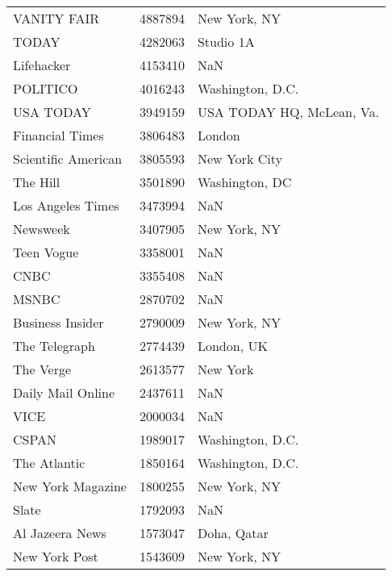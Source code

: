 \begin{longtable}{lrl}
	VANITY FAIR &    4887894 &                          New York, NY \\
	TODAY &    4282063 &                             Studio 1A \\
	Lifehacker &    4153410 &                                   NaN \\
	POLITICO &    4016243 &                      Washington, D.C. \\
	USA TODAY &    3949159 &             USA TODAY HQ, McLean, Va. \\
	Financial Times &    3806483 &                                London \\
	Scientific American &    3805593 &                         New York City \\
	The Hill &    3501890 &                        Washington, DC \\
	Los Angeles Times &    3473994 &                                   NaN \\
	Newsweek &    3407905 &                          New York, NY \\
	Teen Vogue &    3358001 &                                   NaN \\
	CNBC &    3355408 &                                   NaN \\
	MSNBC &    2870702 &                                   NaN \\
	Business Insider &    2790009 &                          New York, NY \\
	The Telegraph &    2774439 &                            London, UK \\
	The Verge &    2613577 &                              New York \\
	Daily Mail Online &    2437611 &                                   NaN \\
	VICE &    2000034 &                                   NaN \\
	CSPAN &    1989017 &                      Washington, D.C. \\
	The Atlantic &    1850164 &                      Washington, D.C. \\
	New York Magazine &    1800255 &                          New York, NY \\
	Slate &    1792093 &                                   NaN \\
	Al Jazeera News &    1573047 &                           Doha, Qatar \\
	New York Post &    1543609 &                          New York, NY \\

\end{longtable}
